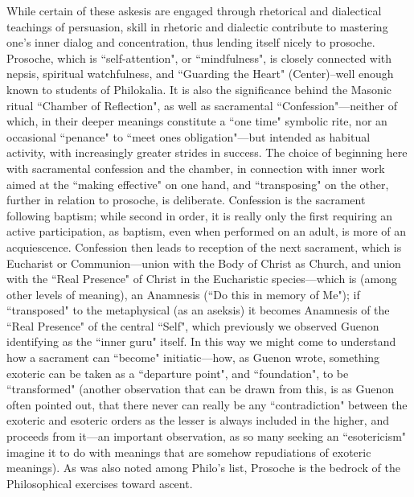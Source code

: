 While certain of these askesis are engaged through rhetorical and dialectical teachings of persuasion, skill in rhetoric and dialectic contribute to mastering one's inner dialog and concentration, thus lending itself nicely to prosoche. Prosoche, which is ``self-attention", or ``mindfulness", is closely connected with nepsis, spiritual watchfulness, and ``Guarding the Heart" (Center)–well enough known to students of Philokalia. It is also the significance behind the Masonic ritual ``Chamber of Reflection", as well as sacramental ``Confession"—neither of which, in their deeper meanings constitute a ``one time" symbolic rite, nor an occasional ``penance" to ``meet ones obligation"—but intended as habitual activity, with increasingly greater strides in success. The choice of beginning here with sacramental confession and the chamber, in connection with inner work aimed at the ``making effective" on one hand, and ``transposing" on the other, further in relation to prosoche, is deliberate. Confession is the sacrament following baptism; while second in order, it is really only the first requiring an active participation, as baptism, even when performed on an adult, is more of an acquiescence. Confession then leads to reception of the next sacrament, which is Eucharist or Communion—union with the Body of Christ as Church, and union with the ``Real Presence" of Christ in the Eucharistic species—which is (among other levels of meaning), an Anamnesis (``Do this in memory of Me"); if ``transposed" to the metaphysical (as an aseksis) it becomes Anamnesis of the ``Real Presence" of the central ``Self", which previously we observed Guenon identifying as the ``inner guru" itself. In this way we might come to understand how a sacrament can ``become" initiatic—how, as Guenon wrote, something exoteric can be taken as a ``departure point", and ``foundation", to be ``transformed" (another observation that can be drawn from this, is as Guenon often pointed out, that there never can really be any ``contradiction" between the exoteric and esoteric orders as the lesser is always included in the higher, and proceeds from it—an important observation, as so many seeking an ``esotericism" imagine it to do with meanings that are somehow repudiations of exoteric meanings). As was also noted among Philo's list, Prosoche is the bedrock of the Philosophical exercises toward ascent.


